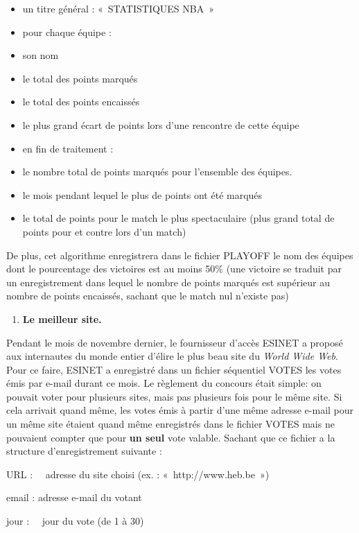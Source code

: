 \liststyleListv
\begin{itemize}
\item {
un titre général : «~STATISTIQUES NBA~»}
\item {
pour chaque équipe : }
\item {
son nom \ }
\item {
le total des points marqués}
\item {
le total des points encaissés}
\item {
le plus grand écart de points lors d’une rencontre de cette équipe}
\item {
en fin de traitement :}
\item {
le nombre total de points marqués pour l’ensemble des équipes.}
\item {
le mois pendant lequel le plus de points ont été marqués}
\item {
le total de points pour le match le plus spectaculaire (plus grand total
de points pour et contre lors d’un match)}
\end{itemize}
{
De plus, cet algorithme enregistrera dans le fichier PLAYOFF le nom des
équipes dont le pourcentage des victoires est au moins 50\% (une
victoire se traduit par un enregistrement dans lequel le nombre de
points marqués est supérieur au nombre de points encaissés, sachant que
le match nul n’existe pas)}

\liststyleExercice
\begin{enumerate}
\item {\sffamily\bfseries
Le meilleur site.}
\end{enumerate}
{
Pendant le mois de novembre dernier, le fournisseur d’accès ESINET a
proposé aux internautes du monde entier d’élire le plus beau site du
\textit{World Wide Web}. Pour ce faire, ESINET a enregistré dans un
fichier séquentiel VOTES les votes émis par e-mail durant ce mois. Le
règlement du concours était simple: on pouvait voter pour plusieurs
sites, mais pas plusieurs fois pour le même site. Si cela arrivait
quand même, les votes émis à partir d’une même adresse e-mail pour un
même site étaient quand même enregistrés dans le fichier VOTES mais ne
pouvaient compter que pour \textbf{un seul} vote valable. Sachant que
ce fichier a la structure d’enregistrement suivante :}

{
URL : \ \ adresse du site choisi (ex. : «~http://www.heb.be~»)}

{
email : adresse e-mail du votant}

{
jour : \ \ jour du vote (de 1 à 30)}

